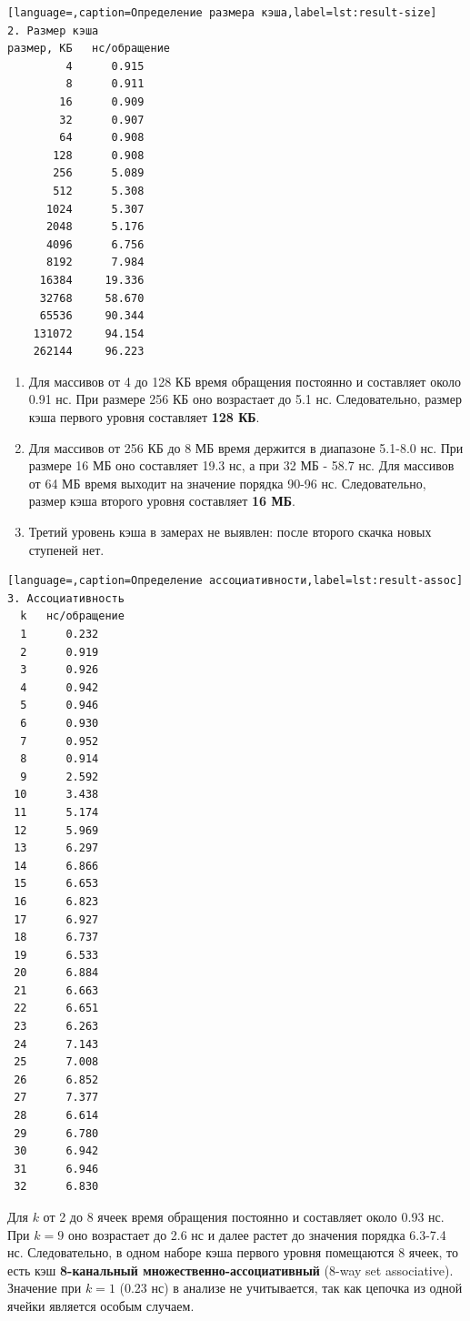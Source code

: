  \par
\begin{lstlisting}[language=,caption=Определение размера кэша,label=lst:result-size]
2. Размер кэша
размер, КБ   нс/обращение
         4      0.915
         8      0.911
        16      0.909
        32      0.907
        64      0.908
       128      0.908
       256      5.089
       512      5.308
      1024      5.307
      2048      5.176
      4096      6.756
      8192      7.984
     16384     19.336
     32768     58.670
     65536     90.344
    131072     94.154
    262144     96.223
\end{lstlisting}
\par
\begin{enumerate}
    \item Для массивов от 4 до 128 КБ время обращения постоянно и составляет около 0.91 нс. При размере 256 КБ оно возрастает до 5.1 нс. Следовательно, размер кэша первого уровня составляет \textbf{128 КБ}.
    \item Для массивов от 256 КБ до 8 МБ время держится в диапазоне 5.1-8.0 нс. При размере 16 МБ оно составляет 19.3 нс, а при 32 МБ - 58.7 нс. Для массивов от 64 МБ время выходит на значение порядка 90-96 нс. Следовательно, размер кэша второго уровня составляет \textbf{16 МБ}.
    \item Третий уровень кэша в замерах не выявлен: после второго скачка новых ступеней нет.
\end{enumerate}

\vspace{8pt}

 \par
\begin{lstlisting}[language=,caption=Определение ассоциативности,label=lst:result-assoc]
3. Ассоциативность
  k   нс/обращение
  1      0.232
  2      0.919
  3      0.926
  4      0.942
  5      0.946
  6      0.930
  7      0.952
  8      0.914
  9      2.592
 10      3.438
 11      5.174
 12      5.969
 13      6.297
 14      6.866
 15      6.653
 16      6.823
 17      6.927
 18      6.737
 19      6.533
 20      6.884
 21      6.663
 22      6.651
 23      6.263
 24      7.143
 25      7.008
 26      6.852
 27      7.377
 28      6.614
 29      6.780
 30      6.942
 31      6.946
 32      6.830
\end{lstlisting}
\par
Для $k$ от 2 до 8 ячеек время обращения постоянно и составляет около 0.93 нс. При $k = 9$ оно возрастает до 2.6 нс и далее растет до значения порядка 6.3-7.4 нс. Следовательно, в одном наборе кэша первого уровня помещаются 8 ячеек, то есть кэш \textbf{8-канальный множественно-ассоциативный} (8-way set associative). Значение при $k = 1$ (0.23 нс) в анализе не учитывается, так как цепочка из одной ячейки является особым случаем.

